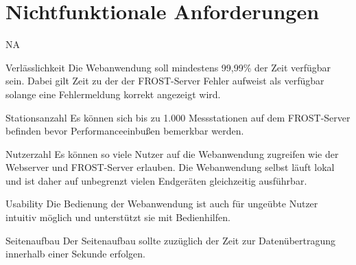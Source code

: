 \section{Nichtfunktionale Anforderungen}

\setcounter{counter}{10}
\begin{Kriterien}{NA}
    \item[Verlässlichkeit]
        Die \gls{Webanwendung} soll mindestens 99,99\% der Zeit verfügbar sein.
        Dabei gilt Zeit zu der der \gls{FROST-Server} Fehler aufweist als verfügbar solange eine Fehlermeldung korrekt angezeigt wird.
    \item[Stationsanzahl]
        Es können sich bis zu 1.000 Messstationen auf dem \gls{FROST-Server} befinden bevor Performanceeinbußen bemerkbar werden.
    \item[Nutzerzahl]
        Es können so viele Nutzer auf die \gls{Webanwendung} zugreifen wie der \gls{Webserver} und \gls{FROST-Server} erlauben.
        Die \gls{Webanwendung} selbst läuft lokal und ist daher auf unbegrenzt vielen Endgeräten gleichzeitig ausführbar.
    \item[Usability]
        Die Bedienung der \gls{Webanwendung} ist auch für ungeübte Nutzer intuitiv möglich und unterstützt sie mit Bedienhilfen.
    \item[Seitenaufbau]
        Der Seitenaufbau sollte zuzüglich der Zeit zur Datenübertragung innerhalb einer Sekunde erfolgen.
\end{Kriterien}